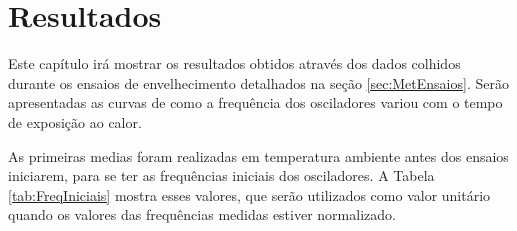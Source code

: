 \chapter{Resultados}
\label{sec:Resultados}

Este capítulo irá mostrar os resultados obtidos através dos dados colhidos durante os ensaios de envelhecimento detalhados na seção \ref{sec:MetEnsaios}. Serão apresentadas as curvas de como a frequência dos osciladores variou com o tempo de exposição ao calor.

As primeiras medias foram realizadas em temperatura ambiente antes dos ensaios iniciarem, para se ter as frequências iniciais dos osciladores. A Tabela \ref{tab:FreqIniciais} mostra esses valores, que serão utilizados como valor unitário quando os valores das frequências medidas estiver normalizado.












